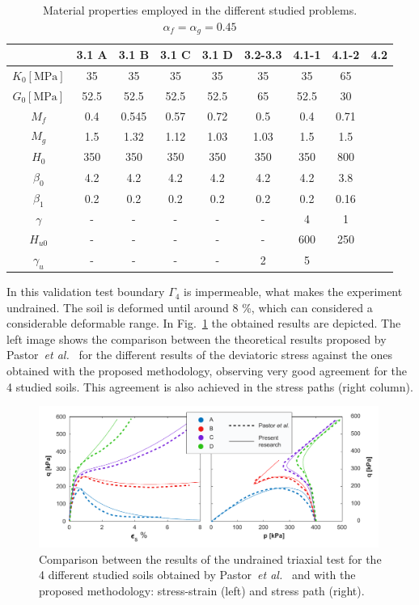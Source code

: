 \documentclass[preprint,12pt,a4paper]{elsarticle}
\begin{document}
\begin{table}
\caption{\label{tab3} Material properties employed in the different studied problems. $\alpha_f=\alpha_g=0.45$} 
\centering
	\begin{tabular}{c|c|c|c|c|c|c|c|c}
	& 3.1 A  & 3.1 B & 3.1 C & 3.1 D & 3.2-3.3 & 4.1-1 & 4.1-2 & 4.2 \\
	\hline
        $K_{0} \left[ \text{MPa} \right]$  & 35 & 35 & 35 & 35 & 35 & 35 & 65 &
        \\ 
        $G_{0} \left[ \text{MPa} \right]$ & 52.5 & 52.5 & 52.5 & 52.5 & 65 & 52.5 & 30 &
        \\
        \(M_{f}\)  & 0.4 & 0.545 & 0.57 & 0.72 & 0.5 & 0.4 & 0.71 &
        \\
        \(M_{g}\) & 1.5 & 1.32 & 1.12 & 1.03 & 1.03 & 1.5 & 1.5 & 
        \\
        \(H_{0}\) & 350 & 350 & 350 & 350 & 350  & 350 & 800 &
        \\
        \(\beta_{0}\) & 4.2 & 4.2 & 4.2 & 4.2 & 4.2 & 4.2 & 3.8 & 
        \\
        \(\beta_{1}\) & 0.2 & 0.2 & 0.2 & 0.2 & 0.2 & 0.2 & 0.16 &
        \\
        \( \gamma\)  & - & - & - & - & - & 4 & 1 & 
        \\
        \(H_{u 0}\) & - & - & - & - & - & 600 & 250 &
        \\
        \( \gamma_{u}\)  & - & - & - & - & 2 & 5 & 
        \\
	\end{tabular}
\end{table}

In this validation test boundary $\Gamma_4$ is impermeable, what makes the experiment undrained. The soil is deformed until around 8 \%, which can considered a considerable deformable range. In Fig.~\ref{fig_undrained} the obtained results are depicted. The left image shows the comparison between the theoretical results proposed by Pastor~\textit{et al.}~\cite{PastorZC:90} for the different results of the deviatoric stress against the ones obtained with the proposed methodology, observing very good agreement for the 4 studied soils. This agreement is also achieved in the stress paths (right column).

\begin{figure}
\centering
\includegraphics[width=0.99\textwidth]{Figs/undrained.pdf}
\caption{Comparison between the results of the undrained triaxial test for the 4 different studied soils obtained by Pastor~\textit{et al.}~\cite{PastorZC:90} and with the proposed methodology: stress-strain (left) and stress path (right).}
\label{fig_undrained}
\end{figure}
\end{document}
